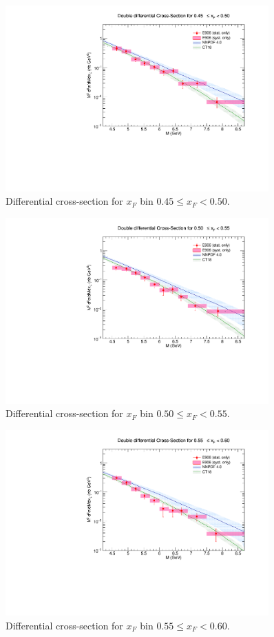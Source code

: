 \documentclass[11pt]{article}
\begin{document}
\clearpage
\begin{figure}[p]
\centering
\includegraphics[width=0.9\textwidth]{./XSecPlots/LH2_9_roofit.pdf}
\caption{Differential cross-section for $x_F$ bin $0.45 \leq x_F < 0.50$.}
\end{figure}
\clearpage
\begin{figure}[p]
\centering
\includegraphics[width=0.9\textwidth]{./XSecPlots/LH2_10_roofit.pdf}
\caption{Differential cross-section for $x_F$ bin $0.50 \leq x_F < 0.55$.}
\end{figure}
\clearpage
\begin{figure}[p]
\centering
\includegraphics[width=0.9\textwidth]{./XSecPlots/LH2_11_roofit.pdf}
\caption{Differential cross-section for $x_F$ bin $0.55 \leq x_F < 0.60$.}
\end{figure}
\end{document}
